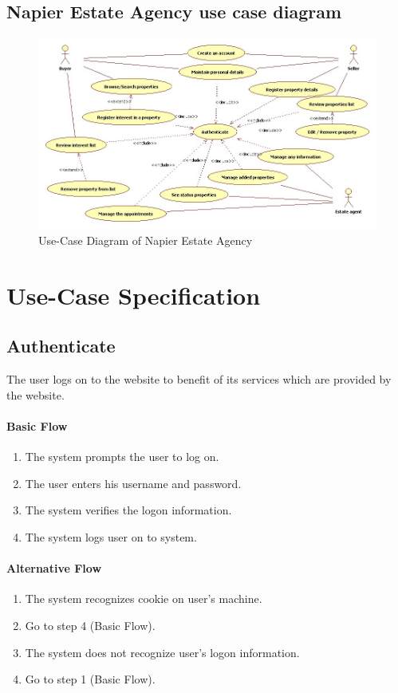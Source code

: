\documentclass[a4paper,12pt]{article}
\begin{document}
\subsection{Napier Estate Agency use case diagram}
\begin{figure}[htbp]
\begin{center}
\includegraphics[width=\linewidth]{pics/useCases.jpg}
\end{center}
\caption{\footnotesize Use-Case Diagram of Napier Estate Agency}
\end{figure}


\section{Use-Case Specification}

\subsection{Authenticate}
The user logs on to the website to benefit of its services which are provided by the website.
\paragraph{Basic Flow}
\begin{enumerate}
\item The system prompts the user to log on.
\item The user enters his username and password.
\item The system verifies the logon information.
\item The system logs user on to system.
\end{enumerate}
\paragraph{Alternative Flow}
\begin{enumerate}
\item The system recognizes cookie on user's machine. 
\item Go to step 4 (Basic Flow).
\item The system does not recognize user's logon information.
\item Go to step 1 (Basic Flow).
\end{enumerate}
\end{document}
